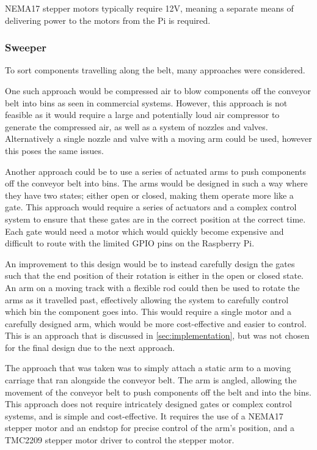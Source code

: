 NEMA17 stepper motors typically require 12V, meaning a separate means of delivering power to the motors from the Pi is required. 

\subsubsection{Sweeper}
\label{sec:sweeper-design}
To sort components travelling along the belt, many approaches were considered.

One such approach would be compressed air to blow components off the conveyor belt into bins as seen in commercial systems. However, this approach is not feasible as it would require a large and potentially loud air compressor to generate the compressed air, as well as a system of nozzles and valves. Alternatively a single nozzle and valve with a moving arm could be used, however this poses the same issues.

Another approach could be to use a series of actuated arms to push components off the conveyor belt into bins. The arms would be designed in such a way where they have two states; either open or closed, making them operate more like a gate. This approach would require a series of actuators and a complex control system to ensure that these gates are in the correct position at the correct time. Each gate would need a motor which would quickly become expensive and difficult to route with the limited GPIO pins on the Raspberry Pi.

An improvement to this design would be to instead carefully design the gates such that the end position of their rotation is either in the open or closed state. An arm on a moving track with a flexible rod could then be used to rotate the arms as it travelled past, effectively allowing the system to carefully control which bin the component goes into. This would require a single motor and a carefully designed arm, which would be more cost-effective and easier to control. This is an approach that is discussed in \autoref{sec:implementation}, but was not chosen for the final design due to the next approach.

The approach that was taken was to simply attach a static arm to a moving carriage that ran alongside the conveyor belt. The arm is angled, allowing the movement of the conveyor belt to push components off the belt and into the bins. This approach does not require intricately designed gates or complex control systems, and is simple and cost-effective. It requires the use of a NEMA17 stepper motor and an endstop for precise control of the arm's position, and a TMC2209 stepper motor driver to control the stepper motor. 

